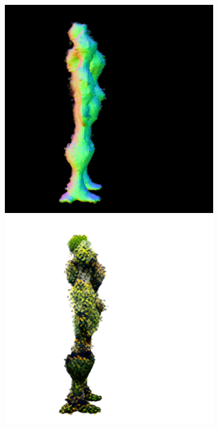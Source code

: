 \begin{figure}[ht]
\begin{subfigure}[b]{0.222\textwidth}
        \caption{}
    \end{subfigure}
    \begin{subfigure}[b]{0.222\textwidth}
        \centering
        \fontsize{9pt}{7pt}\selectfont{}\vspace{.1cm}
        \includegraphics[width=\textwidth]{figures/appendix/magic123_coarse_robot_right_10000_part2.png}
        \includegraphics[width=\textwidth]{figures/appendix/magic123_coarse_robot_right_10000_part1.png}

\end{subfigure}
\end{figure}
